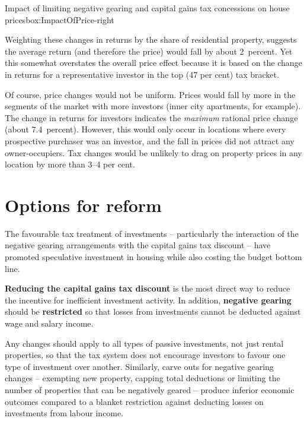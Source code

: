 {\begin{rultrabox}{Impact of limiting negative gearing and capital gains \newline tax concessions on house prices}{box:ImpactOfPrice-right}
\begin{table}[H]
{}

\end{table}


Weighting these changes in returns by the share of residential property, suggests the average return (and therefore the price) would fall by about 2~percent. Yet this somewhat overstates the overall price effect because it is based on the change in returns for a representative investor in the top (47 per cent) tax bracket.

Of course, price changes would not be uniform. Prices would fall by more in the segments of the market with more investors (inner city apartments, for example). The change in returns for investors indicates the \emph{maximum} rational price change (about 7.4~percent). However, this would only occur in locations where every prospective purchaser was an investor, and the fall in prices did not attract any owner-occupiers. Tax changes would be unlikely to drag on property prices in any location by more than 3--4 per cent.

\end{rultrabox}%
}


\chapter{Options for reform}\label{chapter:options-for-reform}
The favourable tax treatment of investments -- particularly the interaction of the negative gearing arrangements with the capital gains tax discount -- have promoted speculative investment in housing while also costing the budget bottom line. 

\textbf{Reducing the capital gains tax discount} is the most direct way to reduce the incentive for inefficient investment activity. 
In addition, \textbf{negative gearing} should be \textbf{restricted} so that losses from investments cannot be deducted against wage and salary income. 

Any changes should apply to all types of passive investments, not just rental properties, so that the tax system does not encourage investors to favour one type of investment over another. 
Similarly, carve outs for negative gearing changes – exempting new property, capping total deductions or limiting the number of properties that can be negatively geared – produce inferior economic outcomes compared to a blanket restriction against deducting losses on investments from labour income.


